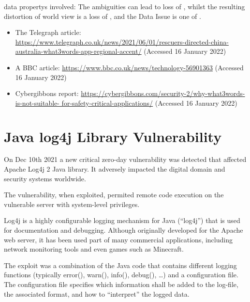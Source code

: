 \Glspl{data property} involved: The ambiguities can lead to loss of ,
whilst the resulting distortion of world view is a loss of ,
and the Data Issue is one of .

\begin{itemize}
\item The Telegraph article:
  \href{https://www.telegraph.co.uk/news/2021/06/01/rescuers-directed-china-australia-what3words-app-regional-accent/}
       {https://www.telegraph.co.uk/news/2021/06/01/rescuers-directed-china- australia-what3words-app-regional-accent/}
       (Accessed 16 January 2022)
     \item A BBC article: 
       \href{https://www.bbc.co.uk/news/technology-56901363}
            {https://www.bbc.co.uk/news/technology-56901363}
       (Accessed 16 January 2022)
          \item Cybergibbons report:
            \href{https://cybergibbons.com/security-2/why-what3words-is-not-suitable-for-safety-critical-applications/}
                 {https://cybergibbons.com/security-2/why-what3words-is-not-suitable- for-safety-critical-applications/}
       (Accessed 16 January 2022)
\end{itemize}

\section{Java log4j Library Vulnerability}\label{bkm:incacc:log4j}
On Dec 10th 2021 a new critical zero-day vulnerability was detected that affected Apache Log4j 2 Java library. 
It adversely impacted the digital domain and security systems worldwide.

The vulnerability, when exploited, permited remote code execution on the vulnerable server with system-level privileges.

Log4j is a highly configurable logging mechanism for Java (“log4j”) that is used for documentation and debugging.
Although originally developed for the Apache web server, it has been used part of many commercial applications,
including network monitoring tools and even games such as Minecraft.

The exploit was a combination of the Java code that contains different logging functions
(typically error(), warn(), info(), debug(), \dots)
and a configuration file.
The configuration file specifies which \gls{information} shall be added 
to the log-file, the associated format, and how to ``interpret'' the logged data.

